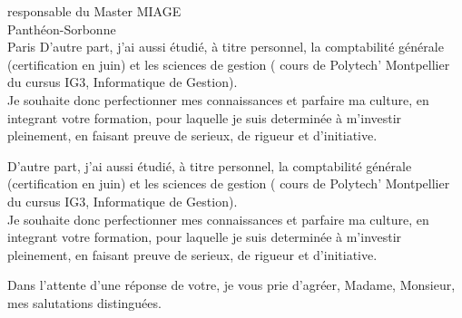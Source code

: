 \documentclass[a4paper]{lettre}
\begin{document}
\begin{letter}{responsable du Master MIAGE\\Panthéon-Sorbonne\\Paris}
D'autre part, j'ai aussi étudié, à titre personnel, la comptabilité générale (certification en juin) et les sciences de gestion ( cours de Polytech' Montpellier du cursus IG3, Informatique de Gestion).\\
Je souhaite donc perfectionner mes connaissances et parfaire ma culture, en integrant votre formation, pour laquelle je suis determinée à m'investir pleinement, en faisant preuve de serieux, de rigueur et d'initiative.

D'autre part, j'ai aussi étudié, à titre personnel, la comptabilité générale (certification en juin) et les sciences de gestion ( cours de Polytech' Montpellier du cursus IG3, Informatique de Gestion).\\
Je souhaite donc perfectionner mes connaissances et parfaire ma culture, en integrant votre formation, pour laquelle je suis determinée à m'investir pleinement, en faisant preuve de serieux, de rigueur et d'initiative.


\closing{Dans l'attente d'une réponse de votre, je vous prie d'agréer, Madame, Monsieur, mes salutations distinguées.}
\end{letter}
\end{document}
